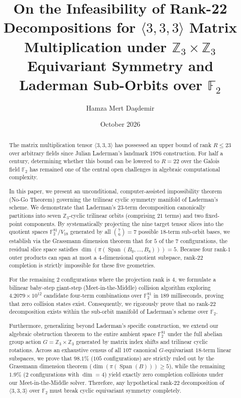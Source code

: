 \documentclass[11pt,reqno]{amsart}
\title[Infeasibility of Rank-22 Decompositions for $\langle 3,3,3 \rangle$ under Equivariant Symmetry]{On the Infeasibility of Rank-22 Decompositions for $\langle 3, 3, 3 \rangle$ Matrix Multiplication under $\mathbb{Z}_3 \times \mathbb{Z}_3$ Equivariant Symmetry and Laderman Sub-Orbits over $\mathbb{F}_2$}
\author{Hamza Mert Da\c{s}demir}
\date{October 2026}
\theoremstyle{plain}
\theoremstyle{definition}
\begin{document}
\begin{abstract}
The matrix multiplication tensor $\langle 3, 3, 3 \rangle$ has possessed an upper bound of rank $R \le 23$ over arbitrary fields since Julian Laderman's landmark 1976 construction. For half a century, determining whether this bound can be lowered to $R = 22$ over the Galois field $\mathbb{F}_2$ has remained one of the central open challenges in algebraic computational complexity.

In this paper, we present an unconditional, computer-assisted impossibility theorem (No-Go Theorem) governing the trilinear cyclic symmetry manifold of Laderman's scheme. We demonstrate that Laderman's $23$-term decomposition canonically partitions into seven $\mathbb{Z}_3$-cyclic trilinear orbits (comprising $21$ terms) and two fixed-point components. By systematically projecting the nine target tensor slices into the quotient spaces $\mathbb{F}_2^{81} / V_{18}$ generated by all $\binom{7}{6} = 7$ possible $18$-term sub-orbit bases, we establish via the Grassmann dimension theorem that for $5$ of the $7$ configurations, the residual slice space satisfies $\dim(\pi(\operatorname{Span}(B_0, \dots, B_8))) = 5$. Because four rank-$1$ outer products can span at most a $4$-dimensional quotient subspace, rank-$22$ completion is strictly impossible for these five geometries.

For the remaining $2$ configurations where the projection rank is $4$, we formulate a bilinear baby-step giant-step (Meet-in-the-Middle) collision algorithm exploring $4.2079 \times 10^{12}$ candidate four-term combinations over $\mathbb{F}_2^{81}$ in $189$ milliseconds, proving that zero collision states exist. Consequently, we rigorously prove that no rank-$22$ decomposition exists within the sub-orbit manifold of Laderman's scheme over $\mathbb{F}_2$.

Furthermore, generalizing beyond Laderman's specific construction, we extend our algebraic obstruction theorem to the entire ambient space $\mathbb{F}_2^{81}$ under the full abelian group action $G = \mathbb{Z}_3 \times \mathbb{Z}_3$ generated by matrix index shifts and trilinear cyclic rotations. Across an exhaustive census of all $107$ canonical $G$-equivariant $18$-term linear subspaces, we prove that $98.1\%$ ($105$ configurations) are strictly ruled out by the Grassmann dimension theorem ($\dim(\pi(\operatorname{Span}(B))) \ge 5$), while the remaining $1.9\%$ ($2$ configurations with $\dim = 4$) yield exactly zero completion collisions under our Meet-in-the-Middle solver. Therefore, any hypothetical rank-$22$ decomposition of $\langle 3, 3, 3 \rangle$ over $\mathbb{F}_2$ must break cyclic equivariant symmetry completely.
\end{abstract}
\end{document}

